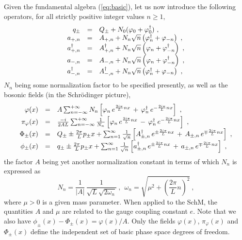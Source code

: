 \documentclass[a4paper,11pt]{article}
\begin{document}
Given the fundamental algebra (\ref{eq:basic}), let us now introduce the
following operators, for all strictly positive integer values $n\ge 1$,
\begin{equation}
\begin{array}{r c l}
q_\pm&=&Q_\pm+N_0(\varphi_0+\varphi^\dagger_0)\ ,\\
a_{+,n}&=&A_{+,n}+N_n\sqrt{n}\left(\varphi^\dagger_n+\varphi_{-n}\right)\ ,\\
a^\dagger_{+,n}&=&
A^\dagger_{+,n}+N_n\sqrt{n}\left(\varphi_n+\varphi^\dagger_{-n}\right)\ ,\\
a_{-,n}&=&A_{-,n}+N_n\sqrt{n}\left(\varphi_n+\varphi^\dagger_{-n}\right)\ ,\\
a^\dagger_{-,n}&=&
A^\dagger_{-,n}+N_n\sqrt{n}\left(\varphi^\dagger_n+\varphi_{-n}\right)\ ,\
\end{array}
\end{equation}
$N_n$ being some normalization factor to be specified presently, as well as
the bosonic fields (in the Schr\"odinger picture),
\begin{equation}
\begin{array}{r c l}
\varphi(x)&=&A\sum_{n=-\infty}^{+\infty} N_n
\left[\varphi_n\,e^{\frac{2i\pi}{L}nx}\,+\,
\varphi^\dagger_n\,e^{-\frac{2i\pi}{L}nx}\right]\ ,\\
\pi_\varphi(x)&=&\frac{-i}{2AL}\sum_{n=-\infty}^{+\infty}\frac{1}{N_n}
\left[\varphi_n\,e^{\frac{2i\pi}{L}nx}\,-\,
\varphi^\dagger_n\,e^{-\frac{2i\pi}{L}nx}\right]\ ,\\
\Phi_\pm(x)&=&Q_\pm\pm\frac{2\pi}{L}p_\pm x+
\sum_{n=1}^\infty\frac{1}{\sqrt{n}}
\left[A^\dagger_{\pm,n}\,e^{\pm\frac{2i\pi}{L}nx}\,+\,
A_{\pm,n}\,e^{\mp\frac{2i\pi}{L}nx}\right]\ ,\\
\phi_\pm(x)&=&q_\pm\pm\frac{2\pi}{L}p_\pm x+
\sum_{n=1}^\infty\frac{1}{\sqrt{n}}
\left[a^\dagger_{\pm,n}\,e^{\pm\frac{2i\pi}{L}nx}\,+\,
a_{\pm,n}\,e^{\mp\frac{2i\pi}{L}nx}\right]\ ,
\end{array}
\end{equation}
the factor $A$ being yet another normalization constant in terms of which 
$N_n$ is expressed as
\begin{equation}
N_n=\frac{1}{|A|}\,\frac{1}{\sqrt{L}\sqrt{2\omega_n}}\ ,\ \ 
\omega_n=\sqrt{\mu^2+\left(\frac{2\pi}{L}n\right)^2}\ ,
\end{equation}
where $\mu>0$ is a given mass parameter. When applied to the SchM, the 
quantities $A$ and $\mu$ are related to the gauge coupling constant $e$.
Note that we also have $\phi_\pm(x)-\Phi_\pm(x)=\varphi(x)/A$.
Only the fields $\varphi(x)$, $\pi_\varphi(x)$ and $\Phi_\pm(x)$ define 
the independent set of basic phase space degrees of freedom.
\end{document}
